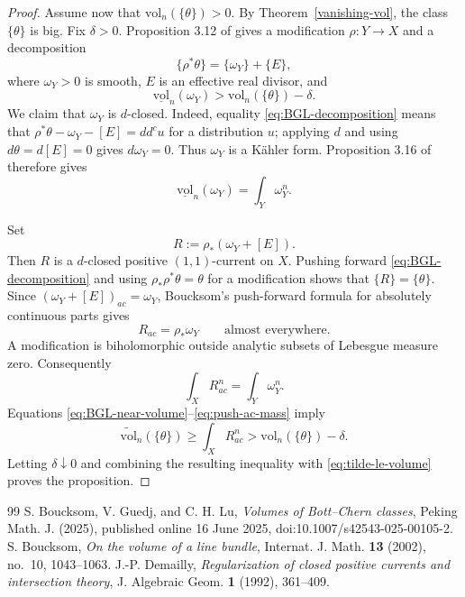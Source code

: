 \documentclass[10pt,a4paper]{amsart}
\begin{document}
\begin{proof}
Assume now that $\mathrm{vol}_n(\{\theta\})>0$. By
Theorem~\ref{vanishing-vol}, the class $\{\theta\}$ is big. Fix $\delta>0$.
Proposition 3.12 of \cite{BGL} gives a modification $\rho:Y\to X$ and a
decomposition
\begin{equation}\label{eq:BGL-decomposition}
 \{\rho^*\theta\}=\{\omega_Y\}+\{E\},
\end{equation}
where $\omega_Y>0$ is smooth, $E$ is an effective real divisor, and
\begin{equation}\label{eq:BGL-near-volume}
 \underline{\mathrm{vol}}_n(\omega_Y)
 >\mathrm{vol}_n(\{\theta\})-\delta.
\end{equation}
We claim that $\omega_Y$ is $d$-closed. Indeed, equality
\eqref{eq:BGL-decomposition} means that
$\rho^*\theta-\omega_Y-[E]=dd^cu$ for a distribution $u$; applying $d$ and
using $d\theta=d[E]=0$ gives $d\omega_Y=0$. Thus $\omega_Y$ is a K\"ahler
form. Proposition 3.16 of \cite{BGL} therefore gives
\begin{equation}\label{eq:omegaY-volume}
 \underline{\mathrm{vol}}_n(\omega_Y)=\int_Y\omega_Y^n.
\end{equation}

Set
\[
 R:=\rho_*(\omega_Y+[E]).
\]
Then $R$ is a $d$-closed positive $(1,1)$-current on $X$. Pushing forward
\eqref{eq:BGL-decomposition} and using $\rho_*\rho^*\theta=\theta$ for a
modification shows that $\{R\}=\{\theta\}$. Since
$(\omega_Y+[E])_{ac}=\omega_Y$, Boucksom's
push-forward formula for absolutely continuous parts
\cite[Proposition 2.2]{Bou} gives
\[
 R_{ac}=\rho_*\omega_Y\qquad\text{almost everywhere}.
\]
A modification is biholomorphic outside analytic subsets of Lebesgue measure
zero. Consequently
\begin{equation}\label{eq:push-ac-mass}
 \int_XR_{ac}^n=\int_Y\omega_Y^n.
\end{equation}
Equations \eqref{eq:BGL-near-volume}--\eqref{eq:push-ac-mass} imply
\[
 \widetilde{\mathrm{vol}}_n(\{\theta\})
 \ge\int_XR_{ac}^n
 >\mathrm{vol}_n(\{\theta\})-\delta.
\]
Letting $\delta\downarrow0$ and combining the resulting inequality with \eqref{eq:tilde-le-volume} proves the proposition.
\end{proof}

\begin{thebibliography}{99}
 S. Boucksom, V. Guedj, and C. H. Lu, \textit{Volumes of Bott--Chern classes}, Peking Math. J. (2025), published online 16 June 2025, doi:10.1007/s42543-025-00105-2.
 S. Boucksom, \textit{On the volume of a line bundle}, Internat. J. Math. \textbf{13} (2002), no.~10, 1043--1063.
 J.-P. Demailly, \textit{Regularization of closed positive currents and intersection theory}, J. Algebraic Geom. \textbf{1} (1992), 361--409.
\end{thebibliography}
\end{document}
